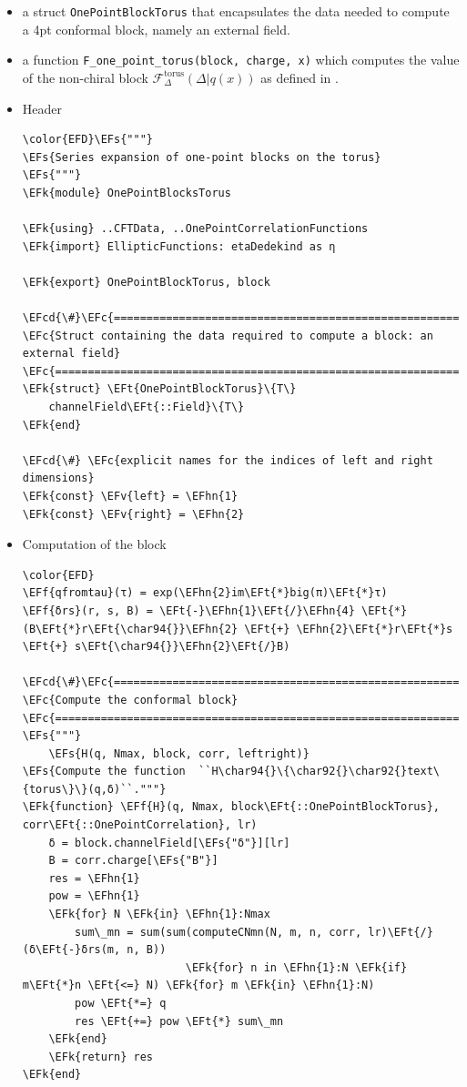 \documentclass[a4paper]{article}
\numberwithin{equation}{section}
\newcommand{\EFc}[1]{\textcolor{EFc}{#1}} %
\newcommand{\EFcd}[1]{\textcolor{EFcd}{#1}} %
\newcommand{\EFs}[1]{\textcolor{EFs}{#1}} %
\newcommand{\EFk}[1]{\textcolor{EFk}{#1}} %
\newcommand{\EFf}[1]{\textcolor{EFf}{#1}} %
\newcommand{\EFv}[1]{\textcolor{EFv}{#1}} %
\newcommand{\EFt}[1]{\textcolor{EFt}{#1}} %
\newcommand{\EFhn}[1]{\textcolor{EFhn}{#1}} %
\begin{document}
\begin{itemize}
\item a struct \texttt{OnePointBlockTorus} that encapsulates the data needed to compute a 4pt conformal block, namely an external field.
\item a function \texttt{F\_one\_point\_torus(block, charge, x)} which computes the value of the non-chiral block \(\mathcal F_{\Delta}^{\text{torus}}(\Delta | q(x))\) as defined in .
\end{itemize}
\begin{itemize}
\item Header
\label{sec:orge92f9e6}

\begin{Code}
\begin{Verbatim}
\color{EFD}\EFs{"""}
\EFs{Series expansion of one-point blocks on the torus}
\EFs{"""}
\EFk{module} OnePointBlocksTorus

\EFk{using} ..CFTData, ..OnePointCorrelationFunctions
\EFk{import} EllipticFunctions: etaDedekind as η

\EFk{export} OnePointBlockTorus, block

\EFcd{\#}\EFc{===========================================================================================}
\EFc{Struct containing the data required to compute a block: an external field}
\EFc{===========================================================================================\#}
\EFk{struct} \EFt{OnePointBlockTorus}\{T\}
    channelField\EFt{::Field}\{T\}
\EFk{end}

\EFcd{\#} \EFc{explicit names for the indices of left and right dimensions}
\EFk{const} \EFv{left} = \EFhn{1}
\EFk{const} \EFv{right} = \EFhn{2}
\end{Verbatim}
\end{Code}
\item Computation of the block
\label{sec:orgcf5f6ff}

\begin{Code}
\begin{Verbatim}
\color{EFD}
\EFf{qfromtau}(τ) = exp(\EFhn{2}im\EFt{*}big(π)\EFt{*}τ)
\EFf{δrs}(r, s, B) = \EFt{-}\EFhn{1}\EFt{/}\EFhn{4} \EFt{*} (B\EFt{*}r\EFt{\char94{}}\EFhn{2} \EFt{+} \EFhn{2}\EFt{*}r\EFt{*}s \EFt{+} s\EFt{\char94{}}\EFhn{2}\EFt{/}B)

\EFcd{\#}\EFc{===========================================================================================}
\EFc{Compute the conformal block}
\EFc{===========================================================================================\#}
\EFs{"""}
    \EFs{H(q, Nmax, block, corr, leftright)}
\EFs{Compute the function  ``H\char94{}\{\char92{}\char92{}text\{torus\}\}(q,δ)``."""}
\EFk{function} \EFf{H}(q, Nmax, block\EFt{::OnePointBlockTorus}, corr\EFt{::OnePointCorrelation}, lr)
    δ = block.channelField[\EFs{"δ"}][lr]
    B = corr.charge[\EFs{"B"}]
    res = \EFhn{1}
    pow = \EFhn{1}
    \EFk{for} N \EFk{in} \EFhn{1}:Nmax
        sum\_mn = sum(sum(computeCNmn(N, m, n, corr, lr)\EFt{/}(δ\EFt{-}δrs(m, n, B))
                         \EFk{for} n in \EFhn{1}:N \EFk{if} m\EFt{*}n \EFt{<=} N) \EFk{for} m \EFk{in} \EFhn{1}:N)
        pow \EFt{*=} q
        res \EFt{+=} pow \EFt{*} sum\_mn
    \EFk{end}
    \EFk{return} res
\EFk{end}


\end{Verbatim}
\end{Code}
\end{itemize}
\end{document}
